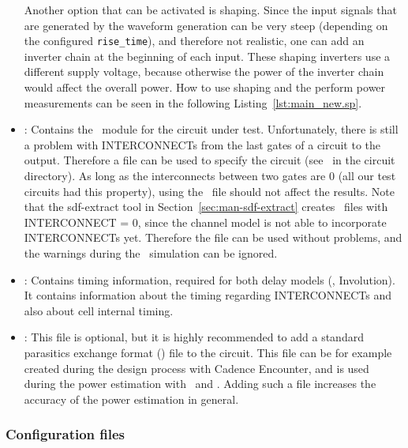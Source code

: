 \begin{itemize}
  Another option that can be activated is shaping. Since the input 
  signals that are generated by the waveform generation can be very steep 
  (depending on the configured \lstinline|rise_time|), and therefore not 
  realistic, one can add an inverter chain at the beginning of each input. 
  These shaping inverters use a different supply voltage, because otherwise the 
  power of the inverter chain would affect the overall power. 
  How to use shaping and the perform power measurements can be seen in the 
  following Listing~\ref{lst:main_new.sp}.
  
  
\item
  : Contains the \verilog\ module for the circuit under test.
  Unfortunately, there is still a problem with INTERCONNECTs from the
  last gates of a circuit to the output. Therefore a 
  file can be used to specify the circuit (see \configcfg\ in the circuit 
  directory). As long as the interconnects between two gates are 0 (all our 
  test circuits had this property), using the \verilog\ file should not affect 
  the results. 
  Note that the sdf-extract tool in Section~\ref{sec:man-sdf-extract} creates 
  \sdffile\ files with INTERCONNECT = 0, since the channel model is not able to 
  incorporate INTERCONNECTs yet. Therefore the  file can be used 
  without problems, and the warnings during the \modelsim\ simulation can be 
  ignored.
\item
  \sdffile: Contains timing information, required for both
  delay models (\modelsim, Involution). It contains information about the
  timing regarding INTERCONNECTs and also about cell internal timing.
  
\item 
 : This file is optional, but it is highly recommended to add a 
 standard parasitics exchange format () file to the circuit. This 
 file can be for example created during the design process with Cadence 
 Encounter, and is used during the power estimation with \dc\ and \primetime. 
 Adding such a file increases the accuracy of the power estimation in general.
\end{itemize}

\subsubsection{Configuration files}\label{sec:man-circuit-configuration-files}

